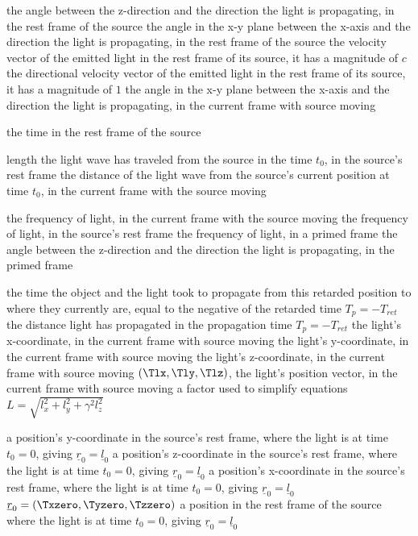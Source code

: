 {the angle between the z-direction and the direction the light is propagating, in the rest frame of the source}
{the angle in the x-y plane between the x-axis and the direction the light is propagating, in the rest frame of the source}
{the velocity vector of the emitted light in the rest frame of its source, it has a magnitude of $c$}
{the directional velocity vector of the emitted light in the rest frame of its source, it has a magnitude of $1$}
\variableterm{\Tvarphi}{\varphi}
{the angle in the x-y plane between the x-axis and the direction the light is propagating, in the current frame with source moving}

{the time in the rest frame of the source}

{length the light wave has traveled from the source in the time $t_0$, in the source's rest frame}
\variableterm{\Tlambda}{\lambda}
{the distance of the light wave from the source's current position at time $t_0$, in the current frame with the source moving}

\variableterm{\Tnu}{\nu}
{the frequency of light, in the current frame with the source moving}
{the frequency of light, in the source's rest frame}
{the frequency of light, in a primed frame}
{the angle between the z-direction and the direction the light is propagating, in the primed frame}

{the time the object and the light took to propagate from this retarded position to where they currently are, equal to the negative of the retarded time $T_p=-T_{ret}$}
{the distance light has propagated in the propagation time $T_p=-T_{ret}$}
{the light's x-coordinate, in the current frame with source moving}
{the light's y-coordinate, in the current frame with source moving}
{the light's z-coordinate, in the current frame with source moving}
{$(\Tlx,\Tly,\Tlz)$, the light's position vector, in the current frame with source moving}
{a factor used to simplify equations $ L =\sqrt{l_x ^2+l_y ^2+\gamma ^2 l_z ^2}$}


{a position's y-coordinate in the source's rest frame, where the light is at time $t_0=0$, giving $\underline{r}_0= \underline{l}_0$}
{a position's z-coordinate in the source's rest frame, where the light is at time $t_0=0$, giving $\underline{r}_0= \underline{l}_0$}
{a position's x-coordinate in the source's rest frame, where the light is at time $t_0=0$, giving $\underline{r}_0= \underline{l}_0$}
{$\underline{r}_0=(\Txzero,\Tyzero,\Tzzero)$ a position in the rest frame of the source where the light is at time $t_0=0$, giving $\underline{r}_0= \underline{l}_0$}


